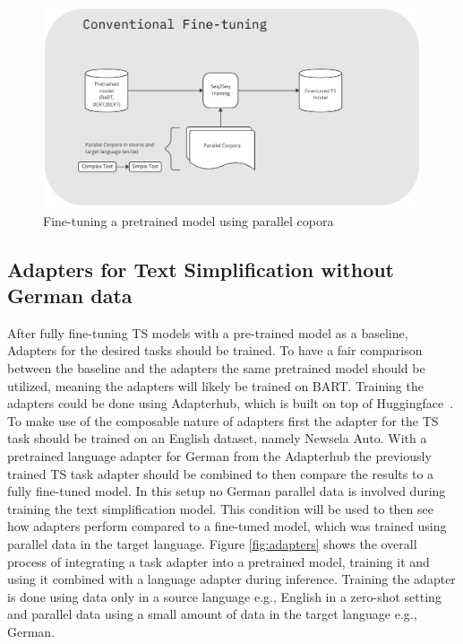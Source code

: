 \begin{figure}
    \centering
    \includegraphics[width=\textwidth]{./figures/finetuning.jpg}
    \caption{Fine-tuning a pretrained model using parallel copora}
    \label{fig:finetuning}
\end{figure}

\subsection{Adapters for Text Simplification without German data}
After fully fine-tuning TS models with a pre-trained model as a baseline,
Adapters for the desired tasks should be trained.
To have a fair comparison between the baseline and the adapters the same pretrained model
should be utilized, meaning the adapters will likely be trained on BART.
Training the adapters could be done using Adapterhub, which is built on top of Huggingface~\cite{Pfeiffer2023}.
To make use of the composable nature of adapters first the adapter for the TS task should be trained
on an English dataset, namely Newsela Auto.
With a pretrained language adapter for German from the Adapterhub the previously trained TS task adapter should be combined
to then compare the results to a fully fine-tuned model.
In this setup no German parallel data is involved during training the text simplification model. This condition will be used to then see how
adapters perform compared to a fine-tuned model, which was trained using parallel data in the target language.
Figure \ref{fig:adapters} shows the overall process of integrating a task adapter into a pretrained model, training it and using it combined
with a language adapter during inference. Training the adapter is done using data only in a source language e.g., English in a 
zero-shot setting and parallel data using a small amount of data in the target language e.g., German.


